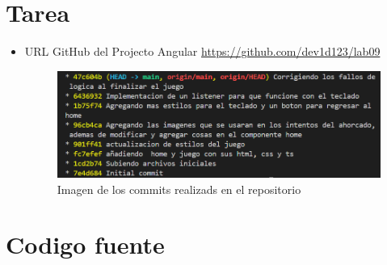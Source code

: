 \documentclass{article}
\begin{document}
	\section{Tarea}
	
\begin{itemize}
    \item URL GitHub del Projecto Angular \url{https://github.com/dev1d123/lab09}   
                \begin{figure}[h]
                \centering
                \includegraphics[width=1\textwidth]{img/commits.png}
                \caption{Imagen de los commits realizads en el repositorio}
                \label{fig:modelo_bd}
            \end{figure}
            
\end{itemize}


	\section{Codigo fuente}
	
\end{document}
